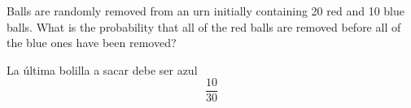 \item Balls are randomly removed from an urn initially containing 20 red and 10 blue balls. What is the probability that all of the red balls are removed before all of the blue ones have been removed?

La última bolilla a sacar debe ser azul
\[ \frac{10}{30} \]